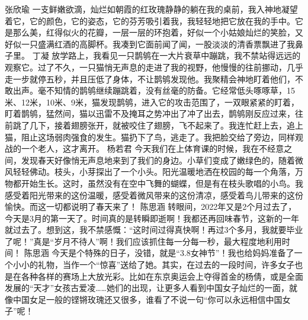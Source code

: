 {}\markdownRendererInterblockSeparator
{}张欣瑜\markdownRendererInterblockSeparator
{}一支鲜嫩欲滴，灿烂如朝霞的红玫瑰静静的躺在我的桌前，我入神地凝望着它，它的颜色，它的姿态，它的芬芳吸引着我，我轻轻地把它放在我的手中。它是那么美，红得似火的花瓣，一层一层的环抱着，好似一个小姑娘灿烂的笑脸，又好似一只盛满红酒的高脚杯。我凑到它面前闻了闻，一股淡淡的清香票飘进了我鼻子里。\markdownRendererInterblockSeparator
{}\markdownRendererInterblockSeparator
{}丁凝\markdownRendererInterblockSeparator
{}放学路上，我看见一只鹊鸲在一大片衰草中蹦跳，我不禁站得远远的观察它。过了不久，一只猫悄无声息的走进了我的视野，他慢慢的往前挪动，几乎走一步就停五秒，并且压低了身体，不让鹊鸲发现他。我聚精会神地盯着他们，不敢出声。毫不知情的鹊鸲继续蹦跳着，没有丝毫的防备。它经常低头啄啄草，15米、12米，10米、9米，猫发现鹊鸲，进入它的攻击范围了，一双眼紧紧的盯着，盯着鹊鸲，猛然间，猫以迅雷不及掩耳之势冲出了冲了出去，鹊鸲刚反应过来，往前跳了几下，接着翅膀张开，就被咬住了翅膀，飞不起来了。我连忙赶上去，追上猫，阻止这场弱肉强食的发生。猫扔下了鸟，逃走了。我把脸交给了旁边，同样观战的一个老人，这才离开。\markdownRendererInterblockSeparator
{}\markdownRendererInterblockSeparator
{}杨若君\markdownRendererInterblockSeparator
{}今天我们在上体育课的时候，我在不经意之间，发现春天好像悄无声息地来到了我们的身边。小草们变成了嫩绿色的，随着微风轻轻佛动。枝头，小芽探出了一个小头。阳光温暖地洒在校园的每一个角落，万物都开始生长。这时，虽然没有在空中飞舞的蝴蝶，但是有在枝头歌唱的小鸟。我感受着阳光带来的这份温暖，感受着微风带来的这份清凉，感受着鸟儿带来的这份愉快。而这一切都说明了春天来了！\markdownRendererInterblockSeparator
{}\markdownRendererInterblockSeparator
{}陈思涵\markdownRendererInterblockSeparator
{}转眼间，2022年又是2个月过去了，今天是3月的第一天了。时间真的是转瞬即逝啊！我都还再回味春节，这新的一年就过去了。想到这，我不禁感慨：“这时间过得真快啊！再过3个多月，我就要毕业了呢！”真是“岁月不待人”啊！我们应该抓住每一分每一秒，最大程度地利用时间！\markdownRendererInterblockSeparator
{}\markdownRendererInterblockSeparator
{}陈思涵\markdownRendererInterblockSeparator
{}今天是个特殊的日子，没错，就是“3.8女神节”！我也给妈妈准备了一个小小的礼物，当作一个“惊喜”送给了她。其实，在过去的一段时间，许多女子也是在各种各样的赛场上大放光彩。比如在东京奥运会上夺得首金的杨倩，或是全面发展的“天才”女孩古爱凌……她们的出现，让更多人看到中国女子灿烂的一面，就像中国女足一般的铿锵玫瑰还又很多，谁看了不说一句“你可以永远相信中国女子”呢！\markdownRendererInterblockSeparator
